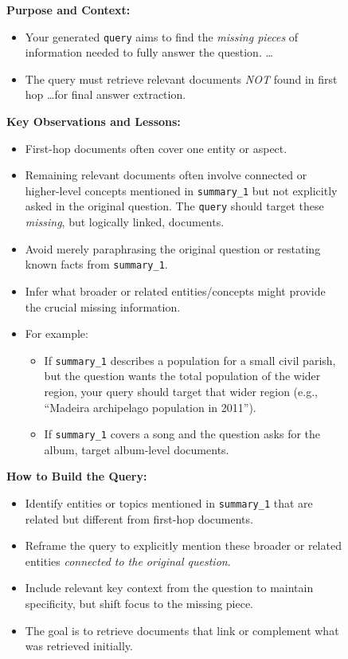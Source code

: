 \begin{figure}[!ht]
\begin{tcolorbox}
\vspace{1mm}
\textbf{Purpose and Context:}
\begin{itemize}[left=0em]
    \item Your generated \texttt{query} aims to find the \emph{missing pieces} of information needed to fully answer the question. \ldots
    \item The query must retrieve relevant documents \emph{NOT} found in first hop \ldots for final answer extraction.
\end{itemize}

\vspace{1mm}
\textbf{Key Observations and Lessons:}
\begin{itemize}[left=0em]
    \item First-hop documents often cover one entity or aspect.
    \item Remaining relevant documents often involve connected or higher-level concepts mentioned in \texttt{summary\_1} but not explicitly asked in the original question. The \texttt{query} should target these \emph{missing}, but logically linked, documents.
    \item Avoid merely paraphrasing the original question or restating known facts from \texttt{summary\_1}.
    \item Infer what broader or related entities/concepts might provide the crucial missing information.
    \item For example:
    \begin{itemize}[left=1em]
        \item If \texttt{summary\_1} describes a population for a small civil parish, but the question wants the total population of the wider region, your query should target that wider region (e.g., ``Madeira archipelago population in 2011'').
        \item If \texttt{summary\_1} covers a song and the question asks for the album, target album-level documents.
    \end{itemize}
\end{itemize}

\vspace{1mm}
\textbf{How to Build the Query:}
\begin{itemize}[left=0em]
    \item Identify entities or topics mentioned in \texttt{summary\_1} that are related but different from first-hop documents.
    \item Reframe the query to explicitly mention these broader or related entities \emph{connected to the original question}.
    \item Include relevant key context from the question to maintain specificity, but shift focus to the missing piece.
    \item The goal is to retrieve documents that link or complement what was retrieved initially.
\end{itemize}


\end{tcolorbox}
\end{figure}
